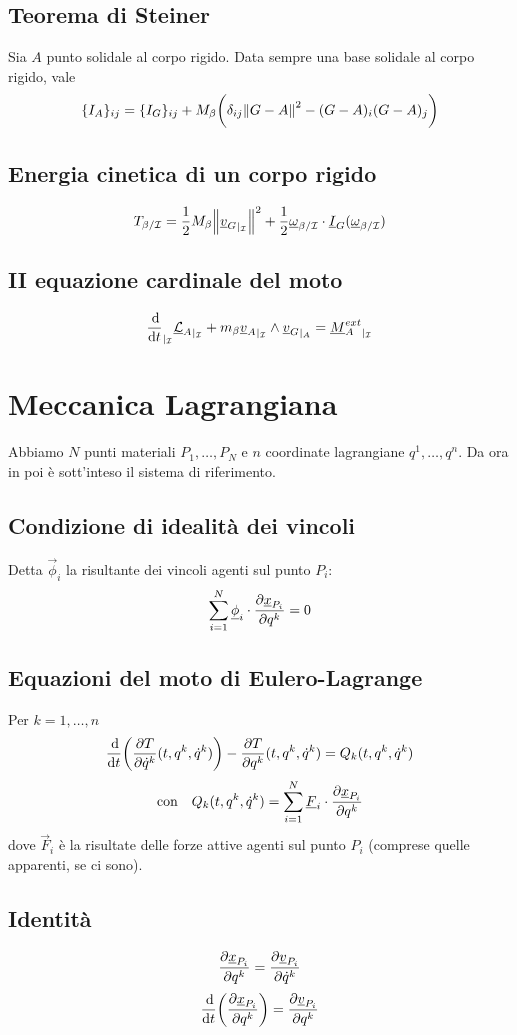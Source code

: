 \documentclass[11pt,landscape]{article}
\begin{document}
\begin{multicols}{3}
    \subsection{Teorema di Steiner}
    Sia $A$ punto solidale al corpo rigido. Data sempre una base solidale al corpo rigido, vale 
        $$ \{I_A\}_{ij} = \{I_G\}_{ij} + M_\beta \bigg (\delta_{ij} \norm{G-A}^2 - (G-A)_i (G-A)_j \bigg)$$
    \subsection{Energia cinetica di un corpo rigido}
        $$T_{\beta/\mathcal{I}} = \frac 1 2 M_\beta \norm{{\underline{v} _G}_{\rvert_{\mathcal{I}}}}^2 + \frac 1 2 {\underline{\omega}}_{\beta/\mathcal{I}} \cdot \underline{I}_G(\underline{\omega}_{\beta/\mathcal{I}})$$
    \subsection{II equazione cardinale del moto}
        $$ {\ddt}_{\rvert_\I} {\vec{\mathcal{L}}_{A}}_{\rvert_\I} + m_\beta {\vec{v}_A}_{\rvert_\I} \wedge {\vec{v}_G}_{\rvert_A} = {\vec{M}^{ext}_A}_{\rvert_\I}$$

\section{Meccanica Lagrangiana}
    Abbiamo $N$ punti materiali $P_1,\dots, P_N$ e $n$ coordinate lagrangiane $q^1, \dots, q^n$. Da ora in poi è sott'inteso il sistema di riferimento.
    \subsection{Condizione di idealità dei vincoli}
        Detta $\vec \phi _i$ la risultante dei vincoli agenti sul punto $P_i$:
        $$ \sum_{i=1}^N \underline{\phi}_i \cdot \frac{\partial \underline{x}_{P_i}}{\partial q^k} = 0$$
    \subsection{Equazioni del moto di Eulero-Lagrange}
        Per $k = 1, \dots, n$
        $$\ddt \bigg( \de{T}{\dot q ^k}\diptre \bigg)- \de{T}{q^k}\diptre = Q_k (t, q^k , \dot q^k)$$
        $$ \text{con} \quad Q_k (t, q^k, \dot q ^k) = \sum_{i=1}^N \underline{F}_i\cdot \frac{\partial \underline{x}_{P_i}}{\partial q^k}$$
        dove $\vec F_i$ è la risultate delle forze attive agenti sul punto $P_i$ (comprese quelle apparenti, se ci sono).
    \subsection{Identità}
        $$\frac{\partial \underline{x}_{P_i}}{\partial q^k} = \frac{\partial \underline{v}_{P_i}}{\partial \dot q^k}$$
        $$ \ddt \bigg(\de{\vec x_{P_i}}{q^k}\bigg) = \de{\vec v_{P_i}}{q^k}$$

\end{multicols}
\end{document}
